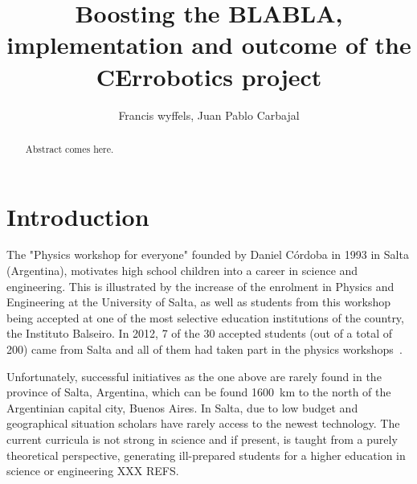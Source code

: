 \documentclass[a4paper]{llncs}
\begin{document}
\linespread{0.965}\selectfont

\mainmatter  %

\title{Boosting the BLABLA, implementation and outcome of the CErrobotics project}

%
%
\author{Francis wyffels, Juan Pablo Carbajal}
%


\maketitle

\begin{abstract}
Abstract comes here.

\end{abstract}

\section{Introduction}
 The "Physics workshop for everyone" founded by Daniel Córdoba in 1993 in Salta (Argentina), motivates high school children into a career in science and engineering.
This is illustrated by the increase of the enrolment in Physics and Engineering at the University of Salta, as well as students from this workshop being accepted at one of the most selective education institutions of the country, the Instituto Balseiro.
In 2012, 7 of the 30 accepted students (out of a total of 200) came from Salta and all of them had taken part in the physics workshops~\citep{salta2012}.

Unfortunately, successful initiatives as the one above are rarely found in the province of Salta, Argentina, which can be found 1600~km to the north of the Argentinian capital city, Buenos Aires.
In Salta, due to low budget and geographical situation scholars have rarely access to the newest technology.
The current curricula is not strong in science and if present, is taught from a purely theoretical perspective, generating ill-prepared students for a higher education in science or engineering XXX REFS.
\end{document}
